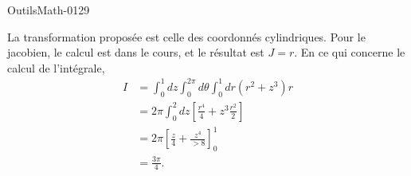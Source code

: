 
\begin{corrige}{OutilsMath-0129}

    La transformation proposée est celle des coordonnés cylindriques. Pour le jacobien, le calcul est dans le cours, et le résultat est \( J=r\). En ce qui concerne le calcul de l'intégrale,
    \begin{subequations}
        \begin{align}
            I&=\int_0^1dz\int_0^{2\pi}d\theta\int_0^1dr(r^2+z^3)r\\
            &=2\pi\int_0^2dz\left[ \frac{ r^4 }{ 4 }+z^3\frac{ r^2 }{2} \right]\\
            &=2\pi\left[ \frac{ z }{ 4 }+\frac{ z^4 }{ >8 } \right]_0^1\\
            &=\frac{ 3\pi }{ 4 }.
        \end{align}
    \end{subequations}

\end{corrige}
